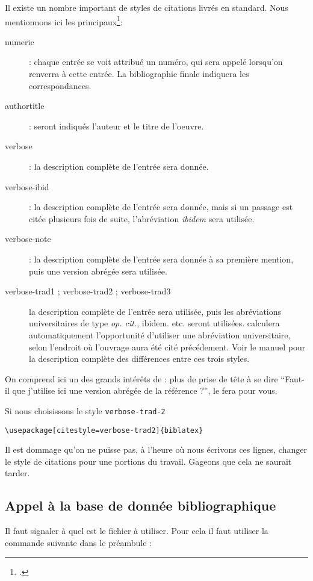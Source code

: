 Il existe un nombre important de styles de citations livrés en standard. Nous mentionnons ici les principaux\footcite[Se reporter à][pour plus de détails.]{biblatex_style}:
\begin{description}
\item[numeric] : chaque entrée se voit attribué un numéro, qui sera appelé lorsqu'on renverra à cette entrée. La bibliographie finale indiquera les correspondances.
\item[authortitle] : seront indiqués l'auteur et le titre de l'oeuvre.
\item[verbose]    : la description complète de l'entrée sera donnée.
\item[verbose-ibid] : la description complète de l'entrée sera donnée, mais si un passage est citée plusieurs fois de suite, l'abréviation \emph{ibidem} sera utilisée.
\item[verbose-note] : la description complète de l'entrée sera donnée à sa première mention, puis une version abrégée sera utilisée.
\item[verbose-trad1 ; verbose-trad2 ; verbose-trad3] la description complète de l'entrée sera utilisée, puis les abréviations universitaires de type \emph{op. cit.}, {ibidem.} etc. seront utilisées.  calculera automatiquement l'opportunité d'utiliser une abréviation universitaire, selon l'endroit où l'ouvrage aura été cité précédement. Voir le manuel pour la description complète des différences entre ces trois styles.
\end{description}

On comprend ici un des grands intérêts de \logiciel{\LaTeX} : plus de prise de tête à se dire \enquote{Faut-il que j'utilise ici une version abrégée de la référence ?},  le fera pour vous.

Si nous choisissons le style \verb|verbose-trad-2|
\begin{verbatim}
\usepackage[citestyle=verbose-trad2]{biblatex}
\end{verbatim}

Il est dommage qu'on ne puisse pas, à l'heure où nous écrivons ces lignes, changer le style de citations pour une portions du travail. Gageons que cela ne saurait tarder.

\subsection{Appel à la base de donnée bibliographique}

Il faut signaler à  quel est le fichier  à utiliser. Pour cela il faut utiliser la commande suivante dans le préambule :

